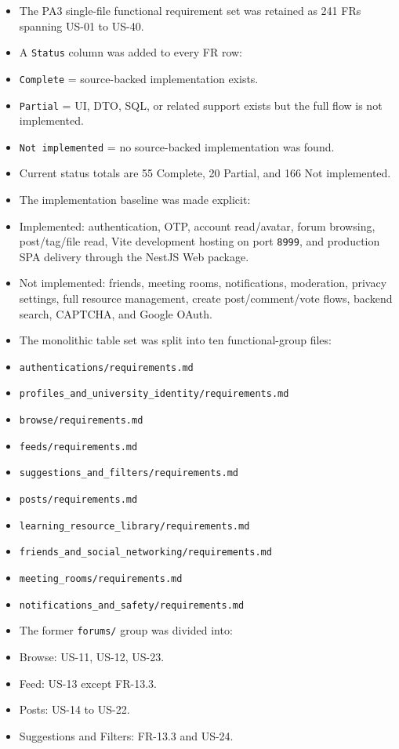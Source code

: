 \documentclass[12pt]{article}
\begin{document}
\begin{itemize}
\item The PA3 single-file functional requirement set was retained as 241 FRs spanning US-01 to US-40.
\item A \texttt{Status} column was added to every FR row:
\item \texttt{Complete} = source-backed implementation exists.
\item \texttt{Partial} = UI, DTO, SQL, or related support exists but the full flow is not implemented.
\item \texttt{Not implemented} = no source-backed implementation was found.
\item Current status totals are 55 Complete, 20 Partial, and 166 Not implemented.
\item The implementation baseline was made explicit:
\item Implemented: authentication, OTP, account read/avatar, forum browsing, post/tag/file read, Vite development hosting on port \texttt{8999}, and production SPA delivery through the NestJS Web package.
\item Not implemented: friends, meeting rooms, notifications, moderation, privacy settings, full resource management, create post/comment/vote flows, backend search, CAPTCHA, and Google OAuth.
\item The monolithic table set was split into ten functional-group files:
\item \texttt{authentications/requirements.md}
\item \texttt{profiles\_and\_university\_identity/requirements.md}
\item \texttt{browse/requirements.md}
\item \texttt{feeds/requirements.md}
\item \texttt{suggestions\_and\_filters/requirements.md}
\item \texttt{posts/requirements.md}
\item \texttt{learning\_resource\_library/requirements.md}
\item \texttt{friends\_and\_social\_networking/requirements.md}
\item \texttt{meeting\_rooms/requirements.md}
\item \texttt{notifications\_and\_safety/requirements.md}
\item The former \texttt{forums/} group was divided into:
\item Browse: US-11, US-12, US-23.
\item Feed: US-13 except FR-13.3.
\item Posts: US-14 to US-22.
\item Suggestions and Filters: FR-13.3 and US-24.
\end{itemize}
\par\medskip
\end{document}
